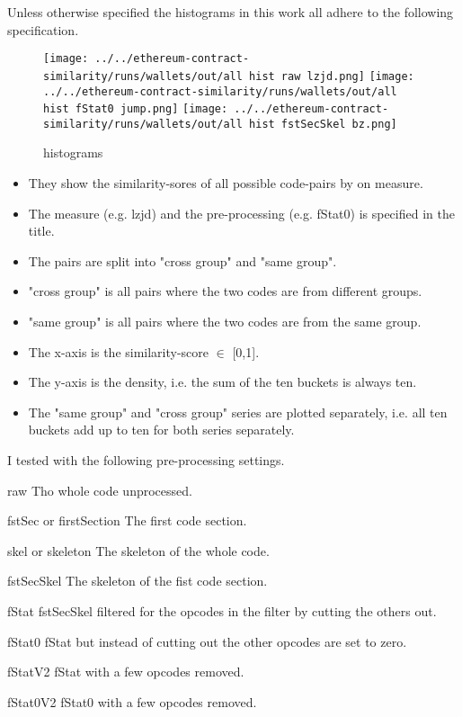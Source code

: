 \documentclass[../main.tex]{subfiles}
\begin{document}
Unless otherwise specified the histograms  in this work all adhere to the following specification.

\begin{figure}[ht!]
  \centering
  \texttt{[image: ../../ethereum-contract-similarity/runs/wallets/out/all hist raw lzjd.png]}%
  \texttt{[image: ../../ethereum-contract-similarity/runs/wallets/out/all hist fStat0 jump.png]}%
  \texttt{[image: ../../ethereum-contract-similarity/runs/wallets/out/all hist fstSecSkel bz.png]}%

  \caption{histograms}
  \label{fig:histograms}
\end{figure}

\begin{itemize}
  \item They show the similarity-sores of all possible code-pairs by on measure.
  \item The measure (e.g. lzjd) and the pre-processing (e.g. fStat0) is specified in the title.
  \item The pairs are split into "cross group" and "same group".
  \item "cross group" is all pairs where the two codes are from different groups.
  \item "same group" is all pairs where the two codes are from the same group.
  \item The x-axis is the similarity-score \(\in\) [0,1].
  \item The y-axis is the density, i.e. the sum of the ten buckets is always ten.
  \item The "same group" and "cross group" series are plotted separately, i.e. all ten buckets add up to ten for both series separately.
\end{itemize}

I tested with the following pre-processing settings.

\begin{desc}
  \item[raw] Tho whole code unprocessed.
  \item[fstSec or firstSection] The first code section.
  \item[skel or skeleton] The skeleton of the whole code.
  \item[fstSecSkel] The skeleton of the fist code section.
  \item[fStat] fstSecSkel filtered for the opcodes in the  filter by cutting the others out.
  \item[fStat0] fStat but instead of cutting out the other opcodes are set to zero.
  \item[fStatV2] fStat with a few opcodes removed.
  \item[fStat0V2] fStat0 with a few opcodes removed.
\end{desc}
\end{document}
